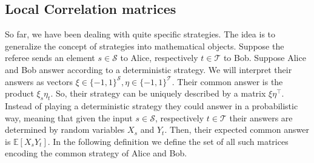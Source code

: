 \subsection{Local Correlation matrices}
So far, we have been dealing with quite specific strategies. The idea is to generalize the concept of strategies into mathematical objects. Suppose the referee sends an element $ s \in \mathcal{S} $ to Alice, respectively $ t \in\mathcal{T} $ to Bob. Suppose Alice and Bob answer according to a deterministic strategy. We will interpret their answers as vectors $ \xi \in \{-1,1\}^{\mathcal{S}}, \eta \in \{-1,1\}^{\mathcal{T}} $.  Their common answer is the product $ \xi_s\eta_t $. So, their strategy can be uniquely described by a  matrix $ \xi\eta^\top $.  Instead of playing a deterministic strategy they could answer in a probabilistic way, meaning that given the input $ s \in \mathcal{S} $, respectively $ t \in \mathcal{T} $ their answers are determined by random variables $ X_s $ and $ Y_t $. Then, their expected common answer is $ \mathbb{E}[X_sY_t] $. In the following definition we define the set of all such matrices encoding the common strategy of Alice and Bob.

